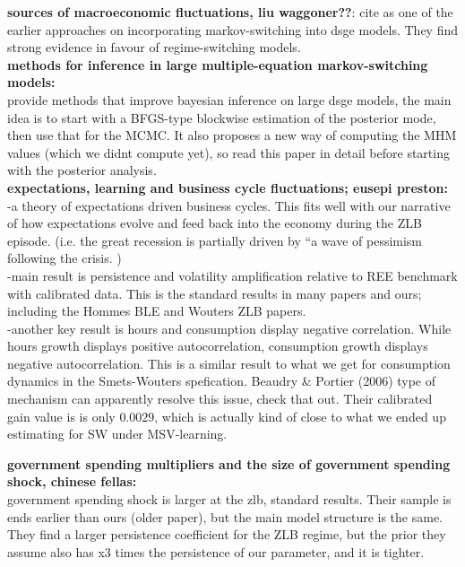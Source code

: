 \documentclass[12pt,reqno]{article}
\numberwithin{equation}{section}
\begin{document}
\textbf{sources of macroeconomic fluctuations, liu waggoner??}: cite as one of the earlier approaches on incorporating markov-switching into dsge models. They find strong evidence in favour of regime-switching models. \\

\textbf{methods for inference in large multiple-equation markov-switching models: } \\
provide methods that improve bayesian inference on large dsge models, the main idea is to start with a BFGS-type blockwise estimation of the posterior mode, then use that for the MCMC. It also proposes a new way of computing the MHM values (which we didnt compute yet), so read this paper in detail before starting with the posterior analysis. \\

\textbf{expectations, learning and business cycle fluctuations; eusepi preston: } \\

-a theory of expectations driven business cycles. This fits well with our narrative of how expectations evolve and feed back into the economy during the ZLB episode. (i.e. the great recession is partially driven by ``a wave of pessimism following the crisis. ) \\

-main result is persistence and volatility amplification relative to REE benchmark with calibrated data. This is the standard results in many papers and ours; including the Hommes BLE and Wouters ZLB papers. \\

-another key result is hours and consumption display negative correlation. While hours growth displays positive autocorrelation, consumption growth displays negative autocorrelation. This is a similar result to what we get for consumption dynamics in the Smets-Wouters spefication. Beaudry \& Portier (2006) type of mechanism can apparently resolve this issue, check that out. Their calibrated gain value is is only $0.0029$, which is actually kind of close to what we ended up estimating for SW under MSV-learning.

\textbf{government spending multipliers and the size of government spending shock, chinese fellas: } \\
government spending shock is larger at the zlb, standard results. Their sample is ends earlier than ours (older paper), but the main model structure is the same. They find a larger persistence coefficient for the ZLB regime, but the prior they assume also has x3 times the persistence of our parameter, and it is tighter. \\
\end{document}
